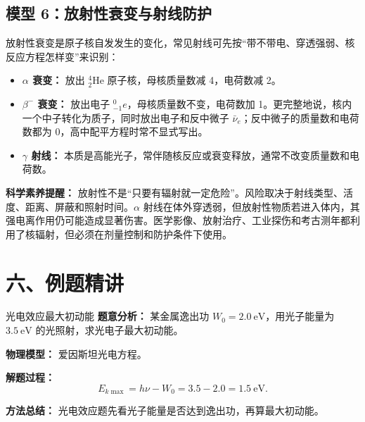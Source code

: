 \subsection*{模型 6：放射性衰变与射线防护}

放射性衰变是原子核自发发生的变化，常见射线可先按“带不带电、穿透强弱、核反应方程怎样变”来识别：
\begin{itemize}
  \item \textbf{$\alpha$ 衰变：} 放出 ${}^4_2\mathrm{He}$ 原子核，母核质量数减 4，电荷数减 2。
  \item \textbf{$\beta^-$ 衰变：} 放出电子 ${}^0_{-1}e$，母核质量数不变，电荷数加 1。更完整地说，核内一个中子转化为质子，同时放出电子和反中微子 $\bar{\nu}_e$；反中微子的质量数和电荷数都为 0，高中配平方程时常不显式写出。
  \item \textbf{$\gamma$ 射线：} 本质是高能光子，常伴随核反应或衰变释放，通常不改变质量数和电荷数。
\end{itemize}

\begin{center}


\label{fig:radioactive-decay-shielding}
\end{center}

\textbf{科学素养提醒：} 放射性不是“只要有辐射就一定危险”。风险取决于射线类型、活度、距离、屏蔽和照射时间。$\alpha$ 射线在体外穿透弱，但放射性物质若进入体内，其强电离作用仍可能造成显著伤害。医学影像、放射治疗、工业探伤和考古测年都利用了核辐射，但必须在剂量控制和防护条件下使用。

\section*{六、例题精讲}

\begin{examplebox}{光电效应最大初动能}
\textbf{题意分析：} 某金属逸出功 $W_0=2.0\ \mathrm{eV}$，用光子能量为 $3.5\ \mathrm{eV}$ 的光照射，求光电子最大初动能。

\textbf{物理模型：} 爱因斯坦光电方程。

\begin{center}

\end{center}

\textbf{解题过程：}
\[
E_{k\max}=h\nu-W_0=3.5-2.0=1.5\ \mathrm{eV}.
\]

\textbf{方法总结：} 光电效应题先看光子能量是否达到逸出功，再算最大初动能。
\end{examplebox}

